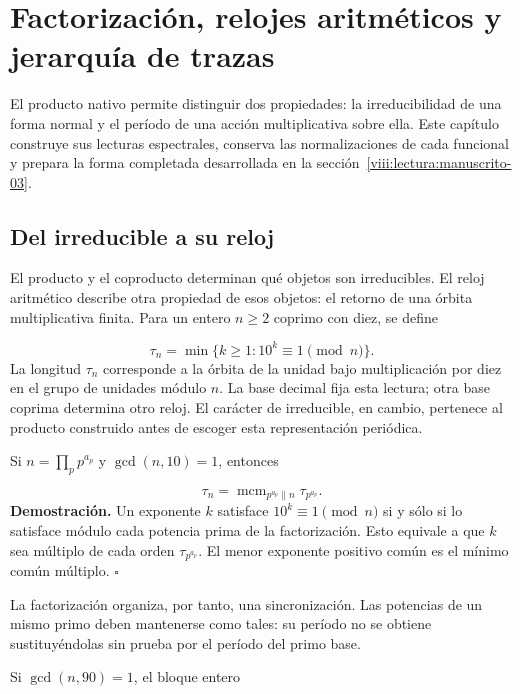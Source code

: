 \section{Factorización, relojes aritméticos y jerarquía de trazas}
\label{viii:lectura:manuscrito-02}
El producto nativo permite distinguir dos propiedades: la irreducibilidad de una forma normal y el período de una acción multiplicativa sobre ella. Este capítulo construye sus lecturas espectrales, conserva las normalizaciones de cada funcional y prepara la forma completada desarrollada en la sección~\ref{viii:lectura:manuscrito-03}.

\subsection{Del irreducible a su reloj}
El producto y el coproducto determinan qué objetos son irreducibles. El reloj aritmético describe otra propiedad de esos objetos: el retorno de una órbita multiplicativa finita. Para un entero $n\ge2$ coprimo con diez, se define

\[
\tau_n=\min\{k\ge1:10^k\equiv1\pmod n\}.
\]
La longitud $\tau_n$ corresponde a la órbita de la unidad bajo multiplicación por diez en el grupo de unidades módulo $n$. La base decimal fija esta lectura; otra base coprima determina otro reloj. El carácter de irreducible, en cambio, pertenece al producto construido antes de escoger esta representación periódica.

Si $n=\prod_p p^{a_p}$ y $\gcd(n,10)=1$, entonces

\[
\tau_n=\operatorname{mcm}_{p^{a_p}\parallel n}\tau_{p^{a_p}}.
\]
\textbf{Demostración.} Un exponente $k$ satisface $10^k\equiv1\pmod n$ si y sólo si lo satisface módulo cada potencia prima de la factorización. Esto equivale a que $k$ sea múltiplo de cada orden $\tau_{p^{a_p}}$. El menor exponente positivo común es el mínimo común múltiplo. \hfill\(\square\)

La factorización organiza, por tanto, una sincronización. Las potencias de un mismo primo deben mantenerse como tales: su período no se obtiene sustituyéndolas sin prueba por el período del primo base.

Si $\gcd(n,90)=1$, el bloque entero

